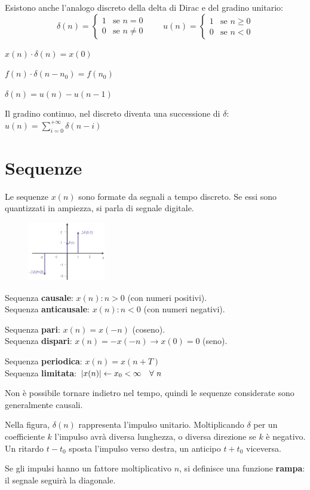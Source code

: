 Esistono anche l'analogo discreto della delta di Dirac e del gradino unitario:
$$\delta(n) = \begin{cases}
1 & \text{se } n = 0 \\
0 & \text{se } n \neq 0
\end{cases}
\qquad
u(n) = \begin{cases}
1 & \text{se } n \geq 0 \\
0 & \text{se } n < 0
\end{cases}$$

$x(n) \cdot \delta(n) = x(0) $ 

$f(n) \cdot \delta(n - n_0) = f(n_0)$ 

$\delta(n) = u(n) - u(n - 1)$

Il gradino continuo, nel discreto diventa una successione di $\delta$: $u(n) = \sum_{i=0}^{+\infty} \delta(n - i)$ 

\section{Sequenze}
Le sequenze $x(n)$ sono formate da segnali a tempo discreto. Se essi sono quantizzati in ampiezza, si parla di segnale digitale. 

\begin{figure}
	\vspace{-15pt}
	\begin{center}
		\includegraphics[width=0.3\textwidth]{Lezioni/Immagini/impulso}
	\end{center}
	\vspace{-20pt}
\end{figure}

Sequenza \textbf{causale}: $x(n) : n > 0$ (con numeri positivi). \\
Sequenza \textbf{anticausale}: $x(n) : n < 0$ (con numeri negativi).

Sequenza \textbf{pari}: $x(n) = x(-n)$ (coseno). \\
Sequenza \textbf{dispari}: $x(n) = -x(-n) \rightarrow x(0) = 0$ (seno).

Sequenza \textbf{periodica}: $x(n) = x(n + T)$ \\
Sequenza \textbf{limitata}: $\left|x(n)\right| \leftarrow x_0 < \infty \quad \forall\ n$

Non è possibile tornare indietro nel tempo, quindi le sequenze considerate sono generalmente causali. 

Nella figura, $\delta(n)$ rappresenta l'impulso unitario. Moltiplicando $\delta$ per un coefficiente $k$ l'impulso avrà diversa lunghezza, o diversa direzione se $k$ è negativo. \\
Un ritardo $t - t_0$ sposta l'impulso verso destra, un anticipo $t + t_0$ viceversa.

Se gli impulsi hanno un fattore moltiplicativo $n$, si definisce una funzione \textbf{rampa}: il segnale seguirà la diagonale. 
